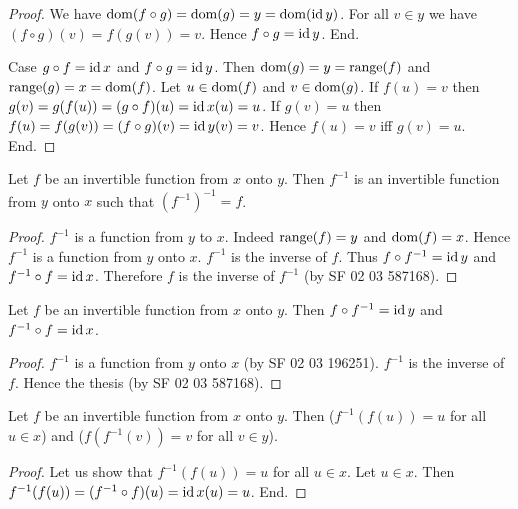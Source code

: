 \documentclass[../../sets-and-functions.ftl.tex]{subfiles}
\begin{document}
\begin{forthel}
\begin{proof}
        We have $\operatorname{dom}(f \circ g) = \operatorname{dom}(g) = y = \operatorname{dom}(\operatorname{id}{y})$.
        For all $v \in y$ we have $(f \circ g)(v) = f(g(v)) = v$.
        Hence $f \circ g = \operatorname{id}{y}$.
      End.

      Case $g \circ f = \operatorname{id}{x}$ and $f \circ g = \operatorname{id}{y}$.
        Then $\operatorname{dom}(g) = y = \operatorname{range}(f)$ and $\operatorname{range}(g) = x = \operatorname{dom}(f)$.
        Let $u \in \operatorname{dom}(f)$ and $v \in \operatorname{dom}(g)$.
        If $f(u) = v$ then $g(v) = g(f(u)) = (g \circ f)(u) = \operatorname{id}{x}(u) = u$.
        If $g(v) = u$ then $f(u) = f(g(v)) = (f \circ g)(v) = \operatorname{id}{y}(v) = v$.
        Hence $f(u) = v$ iff $g(v) = u$.
      End.
    \end{proof}

    \begin{proposition}[SF 02 03 196251]
      Let $f$ be an invertible function from $x$ onto $y$.
      Then $f^{-1}$ is an invertible function from $y$ onto $x$ such that $(f^{-1})^{-1} = f$.
    \end{proposition}
    \begin{proof}
      $f^{-1}$ is a function from $y$ to $x$.
      Indeed $\operatorname{range}(f) = y$ and $\operatorname{dom}(f) = x$.
      Hence $f^{-1}$ is a function from $y$ onto $x$.
      $f^{-1}$ is the inverse of $f$.
      Thus $f \circ f^{-1} = \operatorname{id}{y}$ and $f^{-1} \circ f = \operatorname{id}{x}$.
      Therefore $f$ is the inverse of $f^{-1}$ (by SF 02 03 587168).
    \end{proof}

    \begin{proposition}[SF 02 03 601485]
      Let $f$ be an invertible function from $x$ onto $y$.
      Then $f \circ f^{-1} = \operatorname{id}{y}$ and $f^{-1} \circ f = \operatorname{id}{x}$.
    \end{proposition}
    \begin{proof}
      $f^{-1}$ is a function from $y$ onto $x$ (by SF 02 03 196251).
      $f^{-1}$ is the inverse of $f$.
      Hence the thesis (by SF 02 03 587168).
    \end{proof}

    \begin{proposition}[SF 02 03 173329]
      Let $f$ be an invertible function from $x$ onto $y$.
      Then ($f^{-1}(f(u)) = u$ for all $u \in x$) and ($f(f^{-1}(v)) = v$ for all $v \in y$).
    \end{proposition}
    \begin{proof}
      Let us show that  $f^{-1}(f(u)) = u$ for all $u \in x$.
        Let $u \in x$.
        Then $f^{-1}(f(u)) = (f^{-1} \circ f)(u) = \operatorname{id}{x}(u) = u$.
      End.


\end{proof}
\end{forthel}
\end{document}
